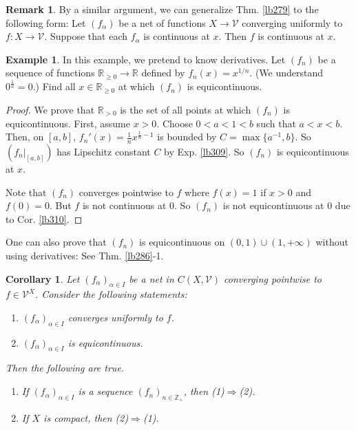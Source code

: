 \documentclass[12pt,b5paper,notitlepage]{article}
\theoremstyle{definition}
\newtheorem{eg}[df]{Example}
\newtheorem{rem}[df]{Remark}
\theoremstyle{plain}
\newtheorem{co}[df]{Corollary}
\newcommand{\mc}{\mathcal}
\newcommand{\Zbb}{\mathbb Z}
\newcommand{\Rbb}{\mathbb R}
\numberwithin{equation}{section}
\begin{document}
\begin{rem}
By a similar argument, we can generalize Thm. \ref{lb279} to the following form: Let $(f_\alpha)$ be a net of functions $X\rightarrow \mc V$ converging uniformly to $f:X\rightarrow\mc V$. Suppose that each $f_\alpha$ is continuous at $x$. Then $f$ is continuous at $x$.
\end{rem}






\begin{eg}\label{lb311}
In this example, we pretend to know derivatives. Let $(f_n)$ be a sequence of functions $\Rbb_{\geq0}\rightarrow\Rbb$ defined by $f_n(x)=x^{1/n}$. (We understand $0^{\frac 1n}=0$.) Find all $x\in\Rbb_{\geq 0}$ at which $(f_n)$ is equicontinuous.
\end{eg}

\begin{proof}
We prove that $\Rbb_{>0}$ is the set of all points at which $(f_n)$ is equicontinuous. First, assume $x>0$. Choose $0<a<1<b$ such that $a<x<b$. Then, on $[a,b]$, $f_n'(x)=\frac 1n x^{\frac 1n-1}$ is bounded by $C=\max\{a^{-1},b\}$. So $(f_n|_{[a,b]})$ has Lipschitz constant $C$ by Exp. \ref{lb309}. So $(f_n)$ is equicontinuous at $x$. 

Note that $(f_n)$ converges pointwise to $f$ where $f(x)=1$ if $x>0$ and $f(0)=0$. But $f$ is not continuous at $0$. So $(f_n)$ is not equicontinuous at $0$ due to Cor. \ref{lb310}.
\end{proof}

One can also prove that $(f_n)$ is equicontinuous on $(0,1)\cup(1,+\infty)$ without using derivatives: See Thm. \ref{lb286}-1.





\begin{co}\label{lb284}
Let $(f_\alpha)_{\alpha\in I}$ be a net in $C(X,\mc V)$ converging pointwise to $f\in\mc V^X$. Consider the following statements:
\begin{enumerate}[label=(\arabic*)]
\item $(f_\alpha)_{\alpha\in I}$ converges uniformly to $f$.
\item $(f_\alpha)_{\alpha\in I}$ is equicontinuous.
\end{enumerate}
Then the following are true.
\begin{enumerate}
\item If $(f_\alpha)_{\alpha\in I}$ is a sequence $(f_n)_{n\in\Zbb_+}$, then (1)$\Rightarrow$(2).
\item If $X$ is compact, then (2)$\Rightarrow$(1).
\end{enumerate}
\end{co}
\end{document}
